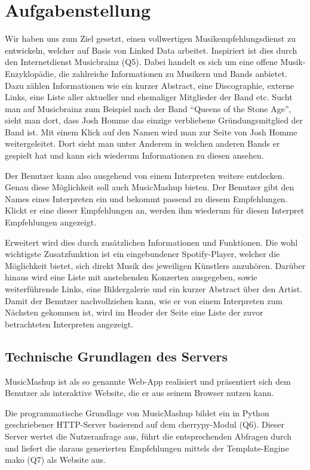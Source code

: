 \section{Aufgabenstellung}


Wir haben uns zum Ziel gesetzt, einen vollwertigen Musikempfehlungsdienst zu entwickeln, welcher auf Basis von Linked Data arbeitet. Inspiriert ist dies durch den Internetdienst Musicbrainz (Q5). Dabei handelt es sich um eine offene Musik-Enzyklopädie, die zahlreiche Informationen zu Musikern und Bands anbietet. Dazu zählen Informationen wie ein kurzer Abstract, eine Discographie, externe Links, eine Liste aller aktueller und ehemaliger Mitglieder der Band etc. Sucht man auf Musicbrainz zum Beispiel nach der Band “Queens of the Stone Age”, sieht man dort, dass Josh Homme das einzige verbliebene Gründungsmitglied der Band ist. Mit einem Klick auf den Namen wird man zur Seite von Josh Homme weitergeleitet. Dort sieht man unter Anderem in welchen anderen Bands er gespielt hat und kann sich wiederum Informationen zu diesen ansehen.


Der Benutzer kann also ausgehend von einem Interpreten weitere entdecken. Genau diese Möglichkeit soll auch MusicMashup bieten. Der Benutzer gibt den Names eines Interpreten ein und bekommt passend zu diesem Empfehlungen. Klickt er eine dieser Empfehlungen an, werden ihm wiederum für diesen Interpret Empfehlungen angezeigt. 


Erweitert wird dies durch zusätzlichen Informationen und Funktionen. Die wohl wichtigste Zusatzfunktion ist ein eingebundener Spotify-Player, welcher die Möglichkeit bietet, sich direkt Musik des jeweiligen Künstlers anzuhören. Darüber hinaus wird eine Liste mit anstehenden Konzerten ausgegeben, sowie weiterführende Links, eine Bildergalerie und ein kurzer Abstract über den Artist. Damit der Benutzer nachvollziehen kann, wie er von einem Interpreten zum Nächsten gekommen ist, wird im Header der Seite eine Liste der zuvor betrachteten Interpreten angezeigt.

\subsection{Technische Grundlagen des Servers}

MusicMashup ist als so genannte Web-App realisiert und präsentiert sich dem Benutzer als interaktive Website, die er aus seinem Browser nutzen kann.

Die programmatische Grundlage von MusicMashup bildet ein in Python geschriebener 
HTTP-Server basierend auf dem cherrypy-Modul (Q6). Dieser Server wertet die Nutzeranfrage aus, führt die entsprechenden Abfragen durch und liefert die daraus generierten Empfehlungen mittels der Template-Engine mako (Q7) als Website aus. 

